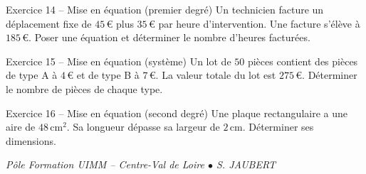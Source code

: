 \documentclass[a4paper,11pt]{article}
\begin{document}
\begin{exo}{Exercice 14 -- Mise en équation (premier degré)}
Un technicien facture un déplacement fixe de $45\,$€ plus $35\,$€ par heure d'intervention. Une facture s'élève à $185\,$€. Poser une équation et déterminer le nombre d'heures facturées.
\end{exo}

\begin{exo}{Exercice 15 -- Mise en équation (système)}
Un lot de $50$ pièces contient des pièces de type A à $4\,$€ et de type B à $7\,$€. La valeur totale du lot est $275\,$€. Déterminer le nombre de pièces de chaque type.
\end{exo}

\begin{exo}{Exercice 16 -- Mise en équation (second degré)}
Une plaque rectangulaire a une aire de $48\,$cm$^2$. Sa longueur dépasse sa largeur de $2\,$cm. Déterminer ses dimensions.
\end{exo}

\vfill
\begin{center}\color{uimmgray}\small
\textit{Pôle Formation UIMM -- Centre-Val de Loire $\bullet$ S. JAUBERT}
\end{center}
\end{document}
